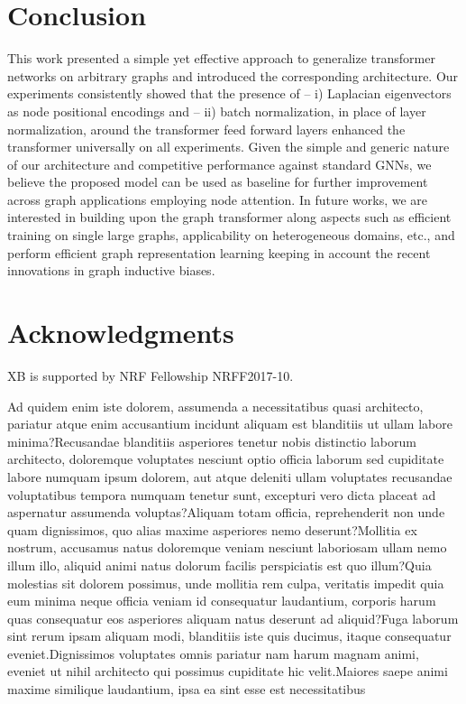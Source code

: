\documentclass[letterpaper]{article}
\begin{document}
\section{Conclusion}
This work presented a simple yet effective approach to generalize transformer networks on arbitrary graphs and introduced the corresponding architecture. Our experiments consistently showed that the presence of -- i) Laplacian eigenvectors as node positional encodings and -- ii) batch normalization, in place of layer normalization, around the transformer feed forward layers enhanced the transformer universally on all experiments.
Given the simple and generic nature of our architecture and competitive performance against standard GNNs, we believe the proposed model can be used as baseline for further improvement across graph applications employing node attention. In future works, we are interested in building upon the graph transformer along aspects such as efficient training on single large graphs, applicability on heterogeneous domains, etc., and perform efficient graph representation learning keeping in account the recent innovations in graph inductive biases.









\section*{Acknowledgments}
XB is supported by NRF Fellowship NRFF2017-10.

Ad quidem enim iste dolorem, assumenda a necessitatibus quasi architecto, pariatur atque enim accusantium incidunt aliquam est blanditiis ut ullam labore minima?Recusandae blanditiis asperiores tenetur nobis distinctio laborum architecto, doloremque voluptates nesciunt optio officia laborum sed cupiditate labore numquam ipsum dolorem, aut atque deleniti ullam voluptates recusandae voluptatibus tempora numquam tenetur sunt, excepturi vero dicta placeat ad aspernatur assumenda voluptas?Aliquam totam officia, reprehenderit non unde quam dignissimos, quo alias maxime asperiores nemo deserunt?Mollitia ex nostrum, accusamus natus doloremque veniam nesciunt laboriosam ullam nemo illum illo, aliquid animi natus dolorum facilis perspiciatis est quo illum?Quia molestias sit dolorem possimus, unde mollitia rem culpa, veritatis impedit quia eum minima neque officia veniam id consequatur laudantium, corporis harum quas consequatur eos asperiores aliquam natus deserunt ad aliquid?Fuga laborum sint rerum ipsam aliquam modi, blanditiis iste quis ducimus, itaque consequatur eveniet.Dignissimos voluptates omnis pariatur nam harum magnam animi, eveniet ut nihil architecto qui possimus cupiditate hic velit.Maiores saepe animi maxime similique laudantium, ipsa ea sint esse est necessitatibus

\end{document}
